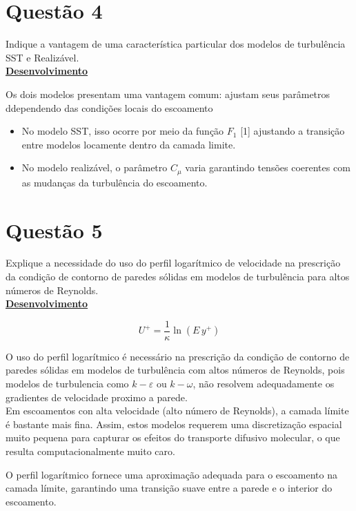 \documentclass[12pt]{article}
\begin{document}
\section*{Questão 4}

Indique a vantagem de uma característica particular dos modelos de turbulência SST e Realizável.\\

\textbf{\underline{Desenvolvimento}}

Os dois modelos presentam uma vantagem comum: ajustam seus parâmetros ddependendo das condições locais do escoamento

\begin{itemize}
	\item No modelo SST, isso ocorre por meio da função $F_1$ [1] ajustando a transição entre modelos locamente dentro da camada limite.
	\item No modelo realizável, o parâmetro $C_\mu$ varia garantindo tensões coerentes com as mudanças da turbulência do escoamento.
\end{itemize}


\section*{Questão 5}

Explique a necessidade do uso do perfil logarítmico de velocidade na prescrição da condição de contorno de paredes sólidas em modelos de turbulência para altos números de Reynolds.\\

\textbf{\underline{Desenvolvimento}}

\begin{equation}
	U^+ = \frac{1}{\kappa} \ln(E \, y^+)
\end{equation}


O uso do perfil logarítmico é necessário na prescrição da condição de contorno de paredes sólidas em modelos de turbulência com altos números de Reynolds, pois modelos de turbulencia como $k-\varepsilon$ ou $k-\omega$, não resolvem adequadamente os gradientes de velocidade proximo a parede. \\
Em escoamentos con alta velocidade (alto número de Reynolds), a camada límite é bastante mais fina. Assim, estos modelos requerem uma discretização espacial muito pequena para capturar os efeitos do transporte difusivo molecular, o que resulta computacionalmente muito caro.

O perfil logarítmico fornece uma aproximação adequada para o escoamento  na camada límite, garantindo uma transição suave entre a parede e o interior do escoamento.
\end{document}
